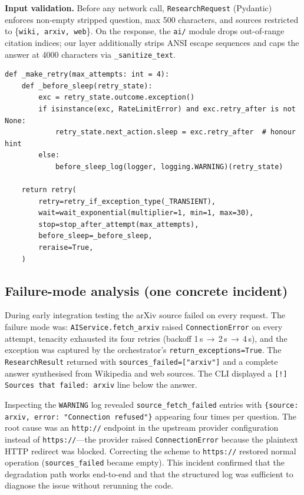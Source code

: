 \documentclass[11pt,a4paper]{article}
\begin{document}
\textbf{Input validation.}
Before any network call, \texttt{ResearchRequest} (Pydantic) enforces non-empty
stripped question, max 500 characters, and sources restricted to
\{\texttt{wiki, arxiv, web}\}. On the response, the \texttt{ai/} module drops
out-of-range citation indices; our layer additionally strips ANSI escape sequences
and caps the answer at 4000 characters via \texttt{\_sanitize\_text}.

\begin{lstlisting}[style=python,
  caption={Retry factory with server \texttt{Retry-After} awareness}]
def _make_retry(max_attempts: int = 4):
    def _before_sleep(retry_state):
        exc = retry_state.outcome.exception()
        if isinstance(exc, RateLimitError) and exc.retry_after is not None:
            retry_state.next_action.sleep = exc.retry_after  # honour hint
        else:
            before_sleep_log(logger, logging.WARNING)(retry_state)

    return retry(
        retry=retry_if_exception_type(_TRANSIENT),
        wait=wait_exponential(multiplier=1, min=1, max=30),
        stop=stop_after_attempt(max_attempts),
        before_sleep=_before_sleep,
        reraise=True,
    )
\end{lstlisting}

\subsection{Failure-mode analysis (one concrete incident)}

During early integration testing the arXiv source failed on every request. The failure
mode was: \texttt{AIService.fetch\_arxiv} raised \texttt{ConnectionError} on every
attempt, tenacity exhausted its four retries (backoff 1\,s\,$\to$\,2\,s\,$\to$\,4\,s),
and the exception was captured by the orchestrator's \texttt{return\_exceptions=True}.
The \texttt{ResearchResult} returned with
\texttt{sources\_failed=["arxiv"]} and a complete answer synthesised from Wikipedia
and web sources. The CLI displayed a
\texttt{[!] Sources that failed: arxiv} line below the answer.

Inspecting the \texttt{WARNING} log revealed \texttt{source\_fetch\_failed} entries
with \texttt{\{source: arxiv, error: "Connection refused"\}} appearing four times per
question. The root cause was an \texttt{http://} endpoint in the upstream provider
configuration instead of \texttt{https://}---the provider raised
\texttt{ConnectionError} because the plaintext HTTP redirect was blocked. Correcting
the scheme to \texttt{https://} restored normal operation (\texttt{sources\_failed}
became empty). This incident confirmed that the degradation path works end-to-end and
that the structured log was sufficient to diagnose the issue without rerunning the
code.
\end{document}
